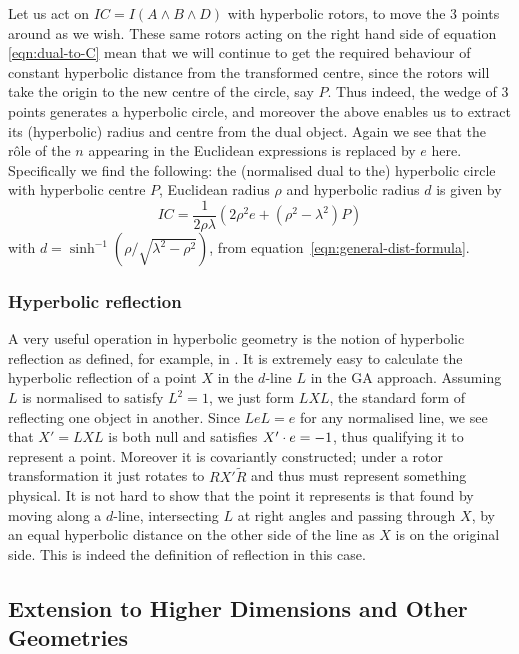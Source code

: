 %
Let us act on $IC=I(A \wedge B \wedge D)$ with hyperbolic rotors,
to move the 3 points around as we wish. These same rotors acting
on the right hand side of equation \ref{eqn:dual-to-C} mean that we will
continue to get the required behaviour of constant hyperbolic
distance from the transformed centre, since the rotors will take
the origin to the new centre of the circle, say $P$. Thus indeed,
the wedge of 3 points generates a hyperbolic circle, and
moreover the above enables us to extract its (hyperbolic)
radius and centre from the dual object. Again we see that the
r\^ole of the $n$ appearing in the Euclidean expressions is
replaced by $e$ here. Specifically we find the following: the
(normalised dual to the) hyperbolic circle with hyperbolic
centre $P$, Euclidean radius $\rho$ and hyperbolic radius $d$
is given by
%
\begin{equation}\label{eqn:non-e-circle}
IC = \frac{1}{2 \rho \lambda} \left( 2 \rho^2 e +
(\rho^2-\lambda^2) P \right)
\end{equation}
%
with $d= \sinh^{-1} (\rho/\sqrt{\lambda^2-\rho^2})$, from
equation~\ref{eqn:general-dist-formula}.

\subsubsection{Hyperbolic reflection}

A very useful operation in hyperbolic geometry is the notion of
hyperbolic reflection as defined, for example, in \cite{GEOM:Brannan}. 
It is extremely easy to calculate the hyperbolic
reflection of a point $X$ in the $d$-line $L$ in the GA approach.
Assuming $L$ is normalised to satisfy $L^2=1$, we just form $LXL$,
the standard form of reflecting one object in another. Since $L e
L = e$ for any normalised line, we see that $X'=LXL$ is both
null and satisfies $X' \cdot e=-1$, thus qualifying it to represent a
point. Moreover it is covariantly constructed;
under a rotor transformation it just rotates to $R X'
\tilde{R}$ and thus must represent something physical. It is not
hard to show that the point it represents is that found by moving
along a $d$-line, intersecting $L$ at right angles and passing
through $X$, by an equal hyperbolic distance on the other side
of the line as $X$ is on the original side. This is indeed the
definition of reflection in this case.

\subsection{Extension to Higher Dimensions and Other Geometries}

